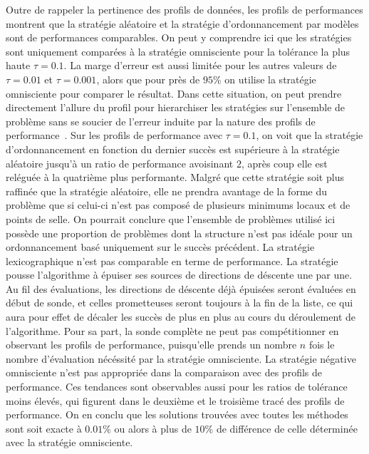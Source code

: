 	Outre de rappeler la pertinence des profils de données, les profils de performances montrent que la stratégie aléatoire et la stratégie d'ordonnancement par modèles sont de performances comparables. On peut y comprendre ici que les stratégies sont uniquement comparées à la stratégie omnisciente pour la tolérance la plus haute $\tau = 0.1$. La marge d'erreur est aussi limitée pour les autres valeurs de $\tau = 0.01$ et $\tau = 0.001$, alors que pour près de $95\%$ on utilise la stratégie omnisciente pour comparer le résultat. Dans cette situation, on peut prendre directement l'allure du profil pour hierarchiser les stratégies sur l'ensemble de problème sans se soucier de l'erreur induite par la nature des profils de performance~\cite{GoSc2016}. Sur les profils de performance avec $\tau = 0.1$, on voit que la stratégie d'ordonnancement en fonction du dernier succès est supérieure à la stratégie aléatoire jusqu'à un ratio de performance avoisinant $2$, après coup elle est reléguée à la quatrième plus performante. Malgré que cette stratégie soit plus raffinée que la stratégie aléatoire, elle ne prendra avantage de la forme du problème que si celui-ci n'est pas composé de plusieurs minimums locaux et de points de selle. On pourrait conclure que l'ensemble de problèmes utilisé ici possède une proportion de problèmes dont la structure n'est pas idéale pour un ordonnancement basé uniquement sur le succès précédent. La stratégie lexicographique n'est pas comparable en terme de performance. La stratégie pousse l'algorithme à épuiser ses sources de directions de déscente une par une. Au fil des évaluations, les directions de déscente déjà épuisées seront évaluées en début de sonde, et celles prometteuses seront toujours à la fin de la liste, ce qui aura pour effet de décaler les succès de plus en plus au cours du déroulement de l'algorithme. Pour sa part, la sonde complète ne peut pas compétitionner en observant les profils de performance, puisqu'elle prends un nombre $n$ fois le nombre d'évaluation nécéssité par la stratégie omnisciente. La stratégie négative omnisciente n'est pas appropriée dans la comparaison avec des profils de performance. Ces tendances sont observables aussi pour les ratios de tolérance moins élevés, qui figurent dans le deuxième et le troisième tracé des profils de performance. On en conclu que les solutions trouvées avec toutes les méthodes sont soit exacte à $0.01\%$ ou alors à plus de $10\%$ de différence de celle déterminée avec la stratégie omnisciente.  \\\\
